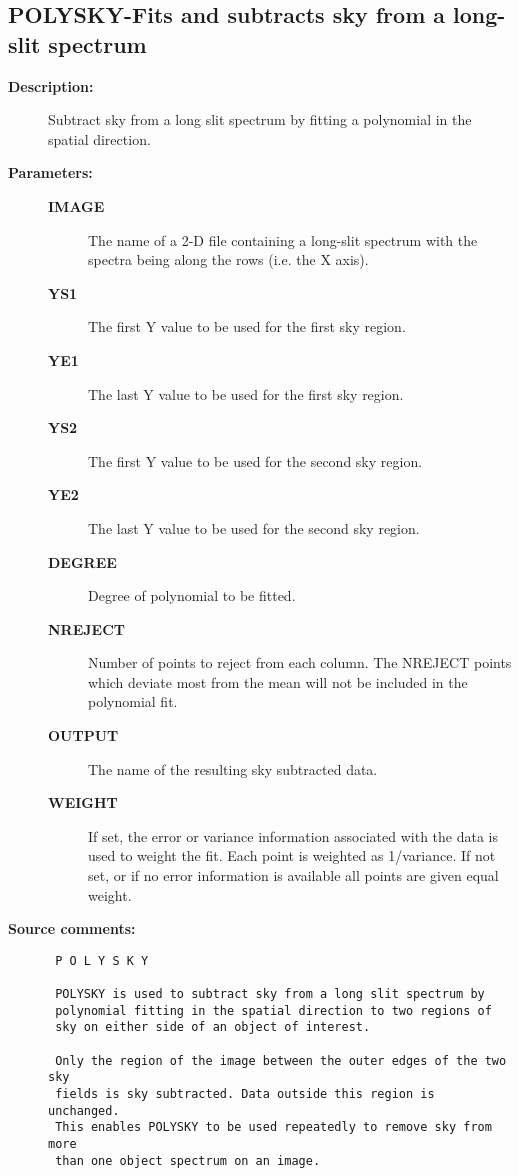 \subsection{POLYSKY-\label{POLYSKY}Fits and subtracts sky from a long-slit spectrum}
\begin{description}

\item [{\bf Description:}]
 Subtract sky from a long slit spectrum by fitting a polynomial
 in the spatial direction.

\item [{\bf Parameters:}]
\begin{description}
\item [{\bf IMAGE}]
 The name of a 2-D file containing a long-slit
 spectrum with the spectra being along the rows
 (i.e. the X axis).
\item [{\bf YS1}]
 The first Y value to be used for the first sky region.
\item [{\bf YE1}]
 The last Y value to be used for the first sky region.
\item [{\bf YS2}]
 The first Y value to be used for the second sky region.
\item [{\bf YE2}]
 The last Y value to be used for the second sky region.
\item [{\bf DEGREE}]
 Degree of polynomial to be fitted.
\item [{\bf NREJECT}]
 Number of points to reject from each column. The NREJECT
 points which deviate most from the mean will not be
 included in the polynomial fit.
\item [{\bf OUTPUT}]
 The name of the resulting sky subtracted data.
\item [{\bf WEIGHT}]
 If set, the error or variance information associated
 with the data is used to weight the fit.  Each point
 is weighted as 1/variance. If not set, or if no
 error information is available all points are given
 equal weight.
\end{description}

\item [{\bf Source comments:}]
\begin{verbatim}
 P O L Y S K Y

 POLYSKY is used to subtract sky from a long slit spectrum by
 polynomial fitting in the spatial direction to two regions of
 sky on either side of an object of interest.

 Only the region of the image between the outer edges of the two sky
 fields is sky subtracted. Data outside this region is unchanged.
 This enables POLYSKY to be used repeatedly to remove sky from more
 than one object spectrum on an image.


\end{verbatim}
\end{description}
